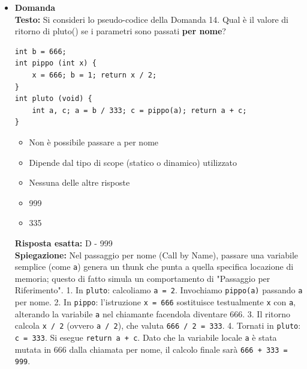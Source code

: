\documentclass[12pt, a4paper]{article}
\newcounter{domandateoria}
\begin{document}
\begin{itemize}
    \item {}\textbf{Domanda \thedomandateoria} \\
    \textbf{Testo:} Si consideri lo pseudo-codice della Domanda 14. Qual è il valore di ritorno di pluto() se i parametri sono passati \textbf{per nome}?
\begin{verbatim}
int b = 666;
int pippo (int x) {
    x = 666; b = 1; return x / 2;
}
int pluto (void) {
    int a, c; a = b / 333; c = pippo(a); return a + c;
}
\end{verbatim}
    \begin{itemize}
        \item[A)] Non è possibile passare a per nome
        \item[B)] Dipende dal tipo di scope (statico o dinamico) utilizzato
        \item[C)] Nessuna delle altre risposte
        \item[D)] 999
        \item[E)] 335
    \end{itemize}
    \textbf{Risposta esatta:} D - 999 \\
    \textbf{Spiegazione:} Nel passaggio per nome (Call by Name), passare una variabile semplice (come \texttt{a}) genera un thunk che punta a quella specifica locazione di memoria; questo di fatto simula un comportamento di "Passaggio per Riferimento". 
    1. In \texttt{pluto}: calcoliamo \texttt{a = 2}. Invochiamo \texttt{pippo(a)} passando \texttt{a} per nome.
    2. In \texttt{pippo}: l'istruzione \texttt{x = 666} sostituisce testualmente \texttt{x} con \texttt{a}, alterando la variabile \texttt{a} nel chiamante facendola diventare 666.
    3. Il ritorno calcola \texttt{x / 2} (ovvero \texttt{a / 2}), che valuta \texttt{666 / 2 = 333}.
    4. Tornati in \texttt{pluto}: \texttt{c = 333}. Si esegue \texttt{return a + c}. Dato che la variabile locale \texttt{a} è stata mutata in 666 dalla chiamata per nome, il calcolo finale sarà \texttt{666 + 333 = 999}.
    \vspace{0.3cm}

\newpage


\end{itemize}
\end{document}

